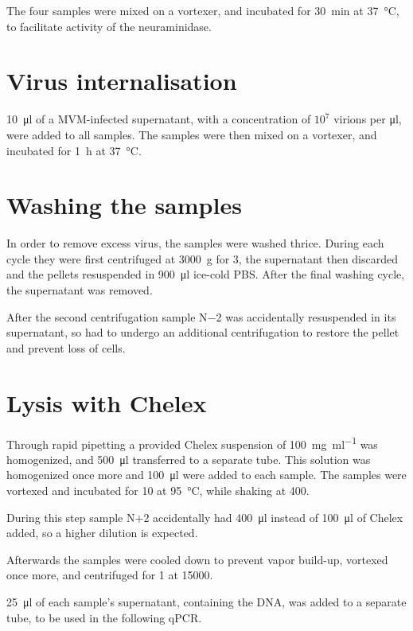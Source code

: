 \documentclass[a4paper,english]{scrreprt}
\begin{document}
The four samples were mixed on a vortexer, and incubated for \SI{30}{\minute}
at \SI{37}{\celsius}, to facilitate activity of the neuraminidase.

\section{Virus internalisation}

\SI{10}{\ul} of a MVM-infected supernatant, with a concentration of $10^7$
virions per \si{\ul}, were added to all samples. The samples were then mixed on
a vortexer, and incubated for \SI{1}{\hour} at \SI{37}{\celsius}.

\section{Washing the samples}

In order to remove excess virus, the samples were washed thrice. During each
cycle they were first centrifuged at \SI{3000}{g} for \SI{3}{\min}, the
supernatant then discarded and the pellets resuspended in \SI{900}{\ul} ice-cold
PBS. After the final washing cycle, the supernatant was removed.

After the second centrifugation sample N$-$2 was accidentally resuspended in
its supernatant, so had to undergo an additional centrifugation to restore the
pellet and prevent loss of cells.

\section{Lysis with Chelex}

Through rapid pipetting a provided Chelex suspension of \SI{100}{\mg \per \ml}
was homogenized, and \SI{500}{\ul} transferred to a separate tube. This
solution was homogenized once more and \SI{100}{\ul} were added to each
sample. The samples were vortexed and incubated for \SI{10}{\min} at
\SI{95}{\celsius}, while shaking at \SI{400}{\rpm}.

During this step sample N$+$2 accidentally had \SI{400}{\ul} instead of
\SI{100}{\ul} of Chelex added, so a higher dilution is expected.

Afterwards the samples were cooled down to prevent vapor build-up, vortexed
once more, and centrifuged for \SI{1}{\min} at \SI{15000}{\rpm}.

\SI{25}{\ul} of each sample's supernatant, containing the DNA, was added to a
separate tube, to be used in the following qPCR.
\end{document}
